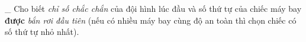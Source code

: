 \_ Cho biết   \emph{    chỉ số chắc chắn   }   của đội hình lúc đầu và số thứ tự của chiếc máy bay   \textbf{    được   }\emph{    bắn rơi đầu tiên   }   (nếu có nhiều máy bay cùng độ an toàn thì chọn chiếc có số thứ tự nhỏ nhất).  

\